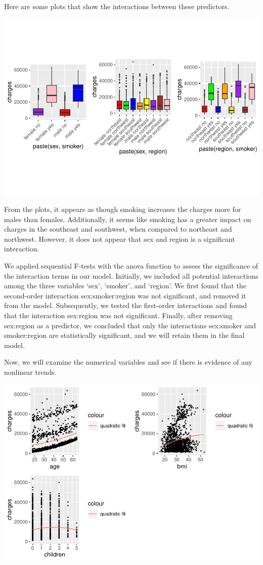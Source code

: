 \documentclass[
  12pt,
]{article}
\begin{document}
Here are some plots that show the interactions between these predictors.

\includegraphics{finalproject_files/figure-latex/unnamed-chunk-11-1.pdf}

From the plots, it appears as though smoking increases the charges more
for males than females. Additionally, it seems like smoking has a
greater impact on charges in the southeast and southwest, when compared
to northeast and northwest. However, it does not appear that sex and
region is a significant interaction.

We applied sequential F-tests with the anova function to assess the
significance of the interaction terms in our model. Initially, we
included all potential interactions among the three variables `sex',
`smoker', and `region'. We first found that the second-order interaction
sex:smoker:region was not significant, and removed it from the model.
Subsequently, we tested the first-order interactions and found that the
interaction sex:region was not significant. Finally, after removing
sex:region as a predictor, we concluded that only the interactions
sex:smoker and smoker:region are statistically significant, and we will
retain them in the final model.

\newpage

Now, we will examine the numerical variables and see if there is
evidence of any nonlinear trends.

\includegraphics{finalproject_files/figure-latex/unnamed-chunk-16-1.pdf}
\end{document}
